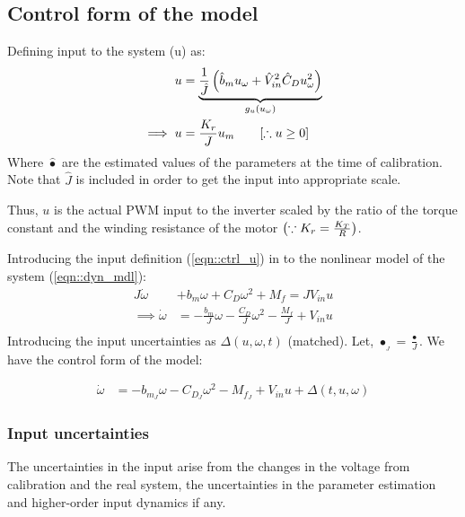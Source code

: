 \subsection{Control form of the model}

Defining input to the system (u) as:
\begin{align}
    u &= \underbrace{\frac{1}{\hat J}\left( \hat b_m u_\omega + \hat V_{in}^2 \hat C_D u_\omega ^2 \right)}_{g_u(u_\omega)} \label{eqn::uw2u}\\
    \implies u &= \frac{K_r}{J} u_m \qquad [\therefore u \geq 0] \label{eqn::ctrl_u}
\end{align}
Where $\hat \bullet$ are the estimated values of the parameters at the time of
calibration. Note that $\hat J$ is included in order to get the input into
appropriate scale.

Thus, $u$ is the actual PWM input to the inverter scaled by the ratio of the
torque constant and the winding resistance of the motor $\left( \because K_r =
\frac{K_T}{R} \right)$.

Introducing the input definition (\ref{eqn::ctrl_u}) in to the nonlinear model
of the system (\ref{eqn::dyn_mdl}):
\begin{align*}
    J\dot \omega &+ b_m \omega + C_D \omega^2 + M_f = J V_{in} u\\
    \implies \dot \omega  &= -\frac{b_m}{J} \omega - \frac{C_D}{J} \omega^2 - \frac{M_f}{J} + V_{in} u\\
\end{align*}
Introducing the input uncertainties as $\Delta(u, \omega, t)$ (matched). Let,
$\bullet_{_J} = \frac{\bullet}{J}$. We have the control form of the model:

\begin{align}
   \dot \omega &= -b_{m_J} \omega - C_{D_J} \omega^2 - M_{f_J} + V_{in} u + \Delta(t, u, \omega) \label{eqn::ctrl_form}
\end{align}

\subsubsection{Input uncertainties}
The uncertainties in the input arise from the changes in the voltage from
calibration and the real system, the uncertainties in the parameter estimation
and higher-order input dynamics if any.

